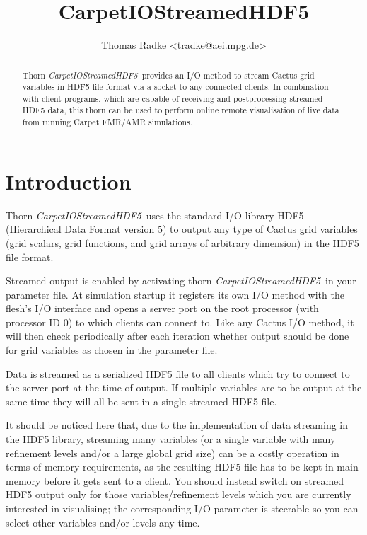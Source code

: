 \documentclass{article}
\begin{document}
\author{Thomas Radke \textless tradke@aei.mpg.de\textgreater}

\title{CarpetIOStreamedHDF5}

\date{}

\maketitle


\newcommand{\ThisThorn}{{\it CarpetIOStreamedHDF5}}

\begin{abstract}
Thorn \ThisThorn\ provides an I/O method to stream Cactus grid
variables in HDF5 file format via a socket to any connected clients.
In combination with client programs, which are capable of receiving and
postprocessing streamed HDF5 data, this thorn can be used to perform online
remote visualisation of live data from running Carpet FMR/AMR simulations.
\end{abstract}


\section{Introduction}

Thorn \ThisThorn\ uses the standard I/O library HDF5 (Hierarchical
Data Format version 5) to output any type of Cactus grid variables
(grid scalars, grid functions, and grid arrays of arbitrary dimension)
in the HDF5 file format.

Streamed output is enabled by activating thorn \ThisThorn\ in your parameter
file. At simulation startup it registers its own I/O method with the
flesh's I/O interface and opens a server port on the root processor
(with processor ID 0) to which clients can connect to.
Like any Cactus I/O method, it will then check periodically after each iteration
whether output should be done for grid variables as chosen in the
parameter file.

Data is streamed as a serialized HDF5 file to all clients which try to
connect to the server port at the time of output. If multiple variables are to
be output at the same time they will all be sent in a single streamed HDF5 file.

It should be noticed here that, due to the implementation of data streaming
in the HDF5 library, streaming many variables (or a single variable with many
refinement levels and/or a large global grid size) can be a costly
operation in terms of memory requirements, as the resulting HDF5 file has
to be kept in main memory before it gets sent to a client. You should instead
switch on streamed HDF5 output only for those variables/refinement levels
which you are currently interested in visualising; the corresponding
I/O parameter is steerable so you can select other variables and/or levels
any time.
\end{document}
